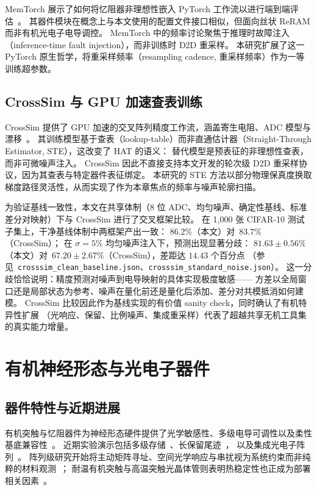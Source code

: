 MemTorch 展示了如何将忆阻器非理想性嵌入 PyTorch 工作流以进行端到端评估~\citep{lammie2022memtorch}。
其器件模块在概念上与本文使用的配置文件接口相似，但面向丝状 ReRAM 而非有机光电子电导调控。
MemTorch 中的频率讨论聚焦于推理时故障注入（inference-time fault injection），而非训练时 D2D 重采样。
本研究扩展了这一 PyTorch 原生哲学，将重采样频率（resampling cadence, 重采样频率）作为一等训练超参数。

\subsection{CrossSim 与 GPU 加速查表训练}

CrossSim 提供了 GPU 加速的交叉阵列精度工作流，涵盖寄生电阻、ADC 模型与漂移~\citep{crosssim2024}。
其训练模型基于查表（lookup-table）而非直通估计器（Straight-Through Estimator, STE），这改变了 HAT 的语义：
替代模型是预表征的非理想性查表，而非可微噪声注入。
CrossSim 因此不直接支持本文开发的轮次级 D2D 重采样协议，因为其查表与特定器件表征绑定。
本研究的 STE 方法以部分物理保真度换取梯度路径灵活性，从而实现了作为本章焦点的频率与噪声轮廓扫描。

为验证基线一致性，本文在共享体制（8 位 ADC、均匀噪声、确定性基线、标准差分对映射）下与 CrossSim 进行了交叉框架比较。
在 1{,}000 张 CIFAR-10 测试子集上，干净基线体制中两框架产出一致：
$86.2\%$（本文）对~$83.7\%$（CrossSim）；
在 $\sigma=5\%$ 均匀噪声注入下，预测出现显著分歧：
$81.63\pm0.56\%$（本文）对~$67.20\pm2.67\%$（CrossSim），差距达 $14.43$ 个百分点
（参见~\texttt{crosssim\_clean\_baseline.json}、\texttt{crosssim\_standard\_noise.json}）。
这一分歧恰恰说明：精度预测对噪声到电导映射的具体实现极度敏感——
方差以全局窗口还是局部状态为参考、噪声在量化前还是量化后添加、差分对共模抵消如何建模。
CrossSim 比较因此作为基线实现的有价值 sanity check，同时确认了有机特异性扩展
（光响应、保留、比例噪声、集成重采样）代表了超越共享无机工具集的真实能力增量。

\section{有机神经形态与光电子器件}

\subsection{器件特性与近期进展}

有机突触与忆阻器件为神经形态硬件提供了光学敏感性、多级电导可调性以及柔性基底兼容性~\citep{xu2025emerging,photonics2025organicreview,beller2024organicneurons,ji2025singleoectneuron}。
近期实验演示包括多级存储~\citep{guo2024organic,jung2024organicfilaments}、长保留尾迹~\citep{zeng2023organicmemristor}，
以及集成光电子阵列~\citep{gebregiorgis2023organiccim,zhang2025opect,zhang2025mooptoelectronic,cui2025multimode}。
阵列级研究开始将主动矩阵寻址、空间光学响应与串扰视为系统约束而非纯粹的材料观测~\citep{visionarch2023crosstalk,amspa2024insensor,jang2023insensor}；
耐温有机突触与高温突触光晶体管则表明热稳定性也正成为部署相关因素~\citep{fuller2020tempresilient,guo2024hightemp}。

